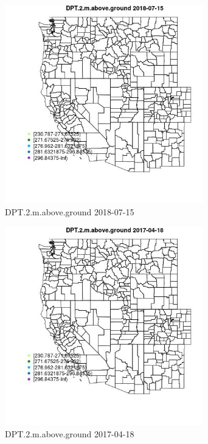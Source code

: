\begin{figure} 
\centering  
\includegraphics[width=0.77\textwidth]{Code_Outputs/Report_ML_input_PM25_Step4_part_e_de_duplicated_aveswNAs_MapObsDPT2maboveground2018-07-15.jpg} 
\caption{\label{fig:Report_ML_input_PM25_Step4_part_e_de_duplicated_aveswNAsMapObsDPT2maboveground2018-07-15}DPT.2.m.above.ground 2018-07-15} 
\end{figure} 
 

\begin{figure} 
\centering  
\includegraphics[width=0.77\textwidth]{Code_Outputs/Report_ML_input_PM25_Step4_part_e_de_duplicated_aveswNAs_MapObsDPT2maboveground2017-04-18.jpg} 
\caption{\label{fig:Report_ML_input_PM25_Step4_part_e_de_duplicated_aveswNAsMapObsDPT2maboveground2017-04-18}DPT.2.m.above.ground 2017-04-18} 
\end{figure} 
 

